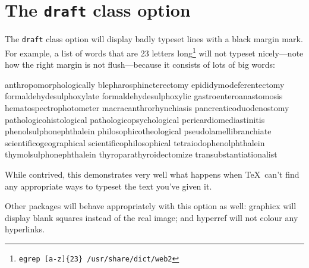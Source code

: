 \documentclass[12pt,draft,article]{memoir}
\begin{document}
\chapter*{The \texttt{draft} class option}

The \texttt{draft} class option will display badly typeset lines with a black margin mark. For example, a list of words that are 23 letters long\footnote{\texttt{egrep [a-z]\{23\} /usr/share/dict/web2}} will not typeset nicely---note how the right margin is not flush---because it consists of lots of big words:

anthropomorphologically
blepharosphincterectomy
epididymodeferentectomy
formaldehydesulphoxylate
formaldehydesulphoxylic
gastroenteroanastomosis
hematospectrophotometer
macracanthrorhynchiasis
pancreaticoduodenostomy
pathologicohistological
pathologicopsychological
pericardiomediastinitis
phenolsulphonephthalein
philosophicotheological
pseudolamellibranchiate
scientificogeographical
scientificophilosophical
tetraiodophenolphthalein
thymolsulphonephthalein
thyroparathyroidectomize
transubstantiationalist

While contrived, this demonstrates very well what happens when \TeX\ can't find any appropriate ways to typeset the text you've given it.

Other packages will behave appropriately with this option as well: \textsf{graphicx} will display blank squares instead of the real image; and \textsf{hyperref} will not colour any hyperlinks. 
\end{document}
